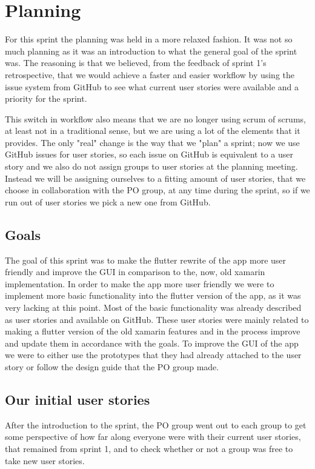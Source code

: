 \section{Planning}
For this sprint the planning was held in a more relaxed fashion.
It was not so much planning as it was an introduction to what the general goal of the sprint was.
The reasoning is that we believed, from the feedback of sprint 1's retrospective, that we would achieve a faster and easier workflow by using the issue system from GitHub to see what current user stories were available and a priority for the sprint. 

This switch in workflow also means that we are no longer using scrum of scrums, at least not in a traditional sense, but we are using a lot of the elements that it provides.
The only "real" change is the way that we "plan" a sprint; now we use GitHub issues for user stories, so each issue on GitHub is equivalent to a user story and we also do not assign groups to user stories at the planning meeting. 
Instead we will be assigning ourselves to a fitting amount of user stories, that we choose in collaboration with the PO group, at any time during the sprint, so if we run out of user stories we pick a new one from GitHub. 

\subsection{Goals}
The goal of this sprint was to make the flutter rewrite of the app more user friendly and improve the GUI in comparison to the, now, old xamarin implementation.
In order to make the app more user friendly we were to implement more basic functionality into the flutter version of the app, as it was very lacking at this point.
Most of the basic functionality was already described as user stories and available on GitHub. 
These user stories were mainly related to making a flutter version of the old xamarin features and in the process improve and update them in accordance with the goals.
To improve the GUI of the app we were to either use the prototypes that they had already attached to the user story or follow the design guide that the PO group made.

\subsection{Our initial user stories}
After the introduction to the sprint, the PO group went out to each group to get some perspective of how far along everyone were with their current user stories, that remained from sprint 1, and to check whether or not a group was free to take new user stories.

